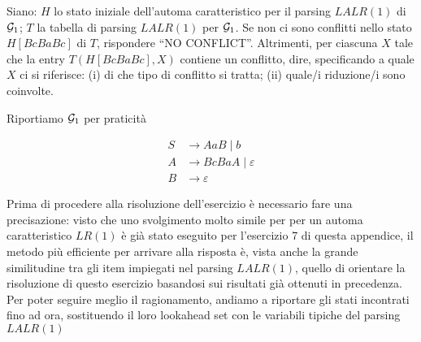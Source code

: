 \documentclass[class=book, crop=false, oneside, 12pt]{standalone}
\begin{document}
Siano: \(H\) lo stato iniziale dell’automa caratteristico per il parsing \(LALR(1)\) di \(\mathcal{G}_1\); \(T\) la tabella di parsing \(LALR(1)\) per \(\mathcal{G}_1\). Se non ci sono conflitti nello stato \(H[BcBaBc]\) di \(T\), rispondere “NO CONFLICT”. Altrimenti, per ciascuna \(X\) tale che la entry \(T(H[BcBaBc], X)\) contiene un conflitto, dire, specificando a quale \(X\) ci si riferisce:  (i) di che tipo di conflitto si tratta; (ii) quale/i riduzione/i sono coinvolte.

Riportiamo \(\mathcal{G}_1\) per praticità

\begin{align*}
    S &\to AaB \mid b \\
    A &\to BcBaA \mid \varepsilon \\
    B &\to \varepsilon
\end{align*}

Prima di procedere alla risoluzione dell'esercizio è necessario fare una precisazione: visto che uno svolgimento molto simile per per un automa caratteristico \(LR(1)\) è già stato eseguito per l'esercizio 7 di questa appendice, il metodo più efficiente per arrivare alla risposta è, vista anche la grande similitudine tra gli item impiegati nel parsing \(LALR(1)\), quello di orientare la risoluzione di questo esercizio basandosi sui risultati già ottenuti in precedenza. Per poter seguire meglio il ragionamento, andiamo a riportare gli stati incontrati fino ad ora, sostituendo il loro lookahead set con le variabili tipiche del parsing \(LALR(1)\)
\end{document}
